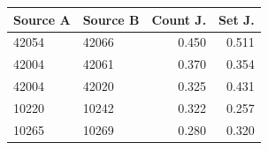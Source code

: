 \begin{tabular}{@{}llrr@{}}
\toprule
Source A & Source B & Count J. & Set J.\\
\midrule
42054 & 42066 & 0.450 & 0.511\\
42004 & 42061 & 0.370 & 0.354\\
42004 & 42020 & 0.325 & 0.431\\
10220 & 10242 & 0.322 & 0.257\\
10265 & 10269 & 0.280 & 0.320\\
\bottomrule
\end{tabular}
